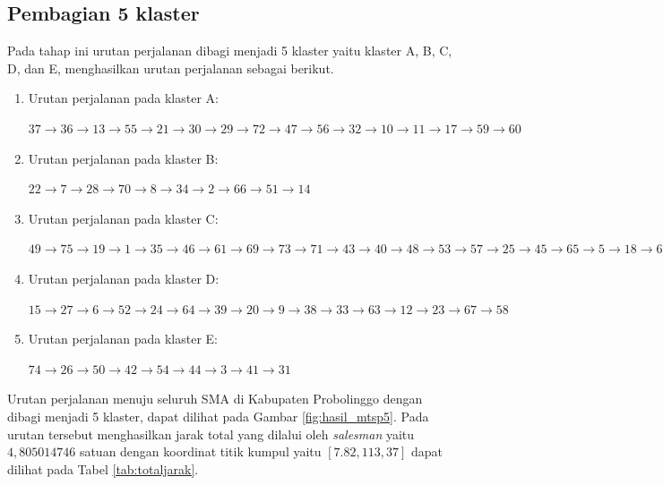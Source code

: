 \subsection{Pembagian 5 klaster}

Pada tahap ini urutan perjalanan dibagi menjadi 5 klaster yaitu klaster A, B, C, D, dan E, menghasilkan urutan perjalanan sebagai berikut.

\begin{enumerate}

\item Urutan perjalanan pada klaster A:

$37\rightarrow36\rightarrow13\rightarrow55\rightarrow21\rightarrow30\rightarrow29\rightarrow72\rightarrow47\rightarrow56\rightarrow32\rightarrow10\rightarrow11\rightarrow17\rightarrow59\rightarrow60$

\item Urutan perjalanan pada klaster B:

$22\rightarrow7\rightarrow28\rightarrow70\rightarrow8\rightarrow34\rightarrow2\rightarrow66\rightarrow51\rightarrow14$

\item Urutan perjalanan pada klaster C:

$49\rightarrow75\rightarrow19\rightarrow1\rightarrow35\rightarrow46\rightarrow61\rightarrow69\rightarrow73\rightarrow71\rightarrow43\rightarrow40\rightarrow48\rightarrow53\rightarrow57\rightarrow25\rightarrow45\rightarrow65\rightarrow5\rightarrow18\rightarrow68\rightarrow16\rightarrow4\rightarrow62$

\item Urutan perjalanan pada klaster D:

$15\rightarrow27\rightarrow6\rightarrow52\rightarrow24\rightarrow64\rightarrow39\rightarrow20\rightarrow9\rightarrow38\rightarrow33\rightarrow63\rightarrow12\rightarrow23\rightarrow67\rightarrow58$

\item Urutan perjalanan pada klaster E:

$74\rightarrow26\rightarrow50\rightarrow42\rightarrow54\rightarrow44\rightarrow3\rightarrow41\rightarrow31$

\end{enumerate}

Urutan perjalanan menuju seluruh SMA di Kabupaten Probolinggo dengan dibagi menjadi 5 klaster, dapat dilihat pada Gambar \ref{fig:hasil_mtsp5}. Pada urutan tersebut menghasilkan jarak total yang dilalui oleh \textit{salesman} yaitu $4,805014746$ satuan dengan koordinat titik kumpul yaitu $[7.82, 113,37]$ dapat dilihat pada Tabel \ref{tab:totaljarak}.

